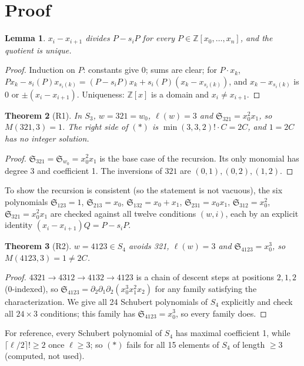 \documentclass[11pt]{article}
\newtheorem{theorem}{Theorem}
\newtheorem{lemma}[theorem]{Lemma}
\theoremstyle{definition}
\newcommand{\Sch}{\mathfrak S}
\begin{document}
\section{Proof}
\begin{lemma}
$x_i-x_{i+1}$ divides $P-s_iP$ for every $P\in\mathbb Z[x_0,\dots,x_n]$, and the quotient is
unique.
\end{lemma}
\begin{proof}
Induction on $P$: constants give $0$; sums are clear; for $P\cdot x_k$,
$Px_k-s_i(P)x_{s_i(k)}=(P-s_iP)x_k+s_i(P)(x_k-x_{s_i(k)})$, and $x_k-x_{s_i(k)}$ is $0$ or
$\pm(x_i-x_{i+1})$. Uniqueness: $\mathbb Z[x]$ is a domain and $x_i\ne x_{i+1}$.
\end{proof}

\begin{theorem}[R1]
In $S_3$, $w=321=w_0$, $\ell(w)=3$ and $\Sch_{321}=x_0^2x_1$, so $M(321,3)=1$. The right side of
$(\ast)$ is $\min(3,3,2)!\cdot C=2C$, and $1=2C$ has no integer solution.
\end{theorem}
\begin{proof}
$\Sch_{321}=\Sch_{w_0}=x_0^2x_1$ is the base case of the recursion. Its only monomial has degree
3 and coefficient 1. The inversions of $321$ are $(0,1),(0,2),(1,2)$.
\end{proof}
To show the recursion is consistent (so the statement is not vacuous), the six polynomials
$\Sch_{123}=1$, $\Sch_{213}=x_0$, $\Sch_{132}=x_0+x_1$, $\Sch_{231}=x_0x_1$,
$\Sch_{312}=x_0^2$, $\Sch_{321}=x_0^2x_1$ are checked against all twelve conditions
$(w,i)$, each by an explicit identity $(x_i-x_{i+1})Q=P-s_iP$.

\begin{theorem}[R2]
$w=4123\in S_4$ avoids 321, $\ell(w)=3$ and $\Sch_{4123}=x_0^3$, so $M(4123,3)=1\ne 2C$.
\end{theorem}
\begin{proof}
$4321\to4312\to4132\to4123$ is a chain of descent steps at positions $2,1,2$ (0-indexed), so
$\Sch_{4123}=\partial_2\partial_1\partial_2(x_0^3x_1^2x_2)$ for any family satisfying the
characterization. We give all 24 Schubert polynomials of $S_4$ explicitly and check all
$24\times3$ conditions; this family has $\Sch_{4123}=x_0^3$, so every family does.
\end{proof}
For reference, every Schubert polynomial of $S_4$ has maximal coefficient 1, while
$\lceil\ell/2\rceil!\ge2$ once $\ell\ge3$; so $(\ast)$ fails for all 15 elements of $S_4$ of
length $\ge3$ (computed, not used).
\end{document}
